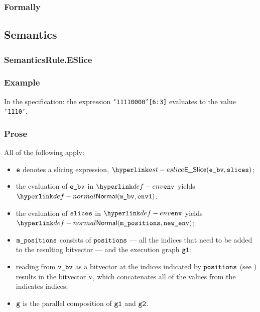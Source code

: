 \subsubsection{Formally}
\begin{mathpar}
\end{mathpar}

\subsection{Semantics}
\subsubsection{SemanticsRule.ESlice\label{sec:SemanticsRule.ESlice}}
\subsubsection{Example}
In the specification:
the expression \texttt{'11110000'[6:3]} evaluates to the value \texttt{'1110'}.

\subsubsection{Prose}
All of the following apply:
\begin{itemize}
\item $\ve$ denotes a slicing expression, $\ESlice(\ebv, \slices)$;
\item the evaluation of $\ebv$ in $\env$ yields $\Normal(\mbv, \envone)$\ProseOrAbnormal;
\item the evaluation of $\slices$ in $\env$ yields $\Normal(\mpositions, \newenv)$\ProseOrAbnormal;
\item $\mpositions$ consists of $\positions$ --- all the indices that need to be added to the
resulting bitvector --- and the execution graph $\vgone$;
\item reading from $\vbv$ as a bitvector at the indices indicated by $\positions$
      (see ) results in the bitvector $\vv$,
      which concatenates all of the values from the indicates indices\ProseOrError;
\item $\vg$ is the parallel composition of $\vgone$ and $\vgtwo$.
\end{itemize}
